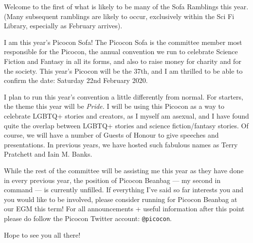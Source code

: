 Welcome to the first of what is likely to be many of the Sofa
Ramblings\texttrademark{} this year. (Many subsequent ramblings are
likely to occur, exclusively within the Sci Fi Library, especially as
February arrives).

I am this year’s Picocon Sofa! The Picocon Sofa is the committee
member most responsible for the Picocon, the annual convention we run
to celebrate Science Fiction and Fantasy in all its forms, and also to
raise money for charity and for the society.  This year’s Picocon will
be the 37th, and I am thrilled to be able to confirm the date:
Saturday 22nd February 2020.

I plan to run this year’s convention a little differently from
normal. For starters, the theme this year will be \emph{Pride.} I will
be using this Picocon as a way to celebrate LGBTQ+ stories and
creators, as I myself am asexual, and I have found quite the overlap
between LGBTQ+ stories and science fiction/fantasy stories. Of course,
we will have a number of Guests of Honour to give speeches and
presentations. In previous years, we have hosted such fabulous names
as Terry Pratchett and Iain M. Banks.

While the rest of the committee will be assisting me this year as they
have done in every previous year, the position of Picocon Beanbag ---
my second in command --- is currently unfilled. If everything I’ve
said so far interests you and you would like to be involved, please
consider running for Picocon Beanbag at our EGM this term! For all
announcements + useful information after this point please do follow
the Picocon Twitter account: \texttt{@picocon}.

Hope to see you all there!
